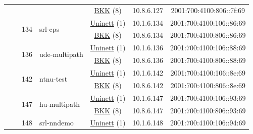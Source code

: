 \begin{small}
\begin{center}
\begin{longtable}{|c|c|c|c|c|c|c|c|}
  &  &  &  & \multicolumn{2}{|c|}{\tiny{\href{http://bkk.no}{BKK} (8)}} & \tiny{10.8.6.127} & \tiny{2001:700:4100:806::7f:69} \\* \cline{3-3}\cline{4-4}\cline{5-5}\cline{6-6}\cline{7-7}\cline{8-8}
  &  & \multirow{2}{*}{\tiny{134}} & \multicolumn{1}{|l|}{\multirow{2}{*}{\tiny{srl-cps}}} & \multicolumn{2}{|c|}{\tiny{\href{https://www.uninett.no}{Uninett} (1)}} & \tiny{10.1.6.134} & \tiny{2001:700:4100:106::86:69} \\* \cline{5-5}\cline{6-6}\cline{7-7}\cline{8-8}
  &  &  &  & \multicolumn{2}{|c|}{\tiny{\href{http://bkk.no}{BKK} (8)}} & \tiny{10.8.6.134} & \tiny{2001:700:4100:806::86:69} \\* \cline{3-3}\cline{4-4}\cline{5-5}\cline{6-6}\cline{7-7}\cline{8-8}
  &  & \multirow{2}{*}{\tiny{136}} & \multicolumn{1}{|l|}{\multirow{2}{*}{\tiny{ude-multipath}}} & \multicolumn{2}{|c|}{\tiny{\href{https://www.uninett.no}{Uninett} (1)}} & \tiny{10.1.6.136} & \tiny{2001:700:4100:106::88:69} \\* \cline{5-5}\cline{6-6}\cline{7-7}\cline{8-8}
  &  &  &  & \multicolumn{2}{|c|}{\tiny{\href{http://bkk.no}{BKK} (8)}} & \tiny{10.8.6.136} & \tiny{2001:700:4100:806::88:69} \\* \cline{3-3}\cline{4-4}\cline{5-5}\cline{6-6}\cline{7-7}\cline{8-8}
  &  & \multirow{2}{*}{\tiny{142}} & \multicolumn{1}{|l|}{\multirow{2}{*}{\tiny{ntnu-test}}} & \multicolumn{2}{|c|}{\tiny{\href{https://www.uninett.no}{Uninett} (1)}} & \tiny{10.1.6.142} & \tiny{2001:700:4100:106::8e:69} \\* \cline{5-5}\cline{6-6}\cline{7-7}\cline{8-8}
  &  &  &  & \multicolumn{2}{|c|}{\tiny{\href{http://bkk.no}{BKK} (8)}} & \tiny{10.8.6.142} & \tiny{2001:700:4100:806::8e:69} \\* \cline{3-3}\cline{4-4}\cline{5-5}\cline{6-6}\cline{7-7}\cline{8-8}
  &  & \multirow{2}{*}{\tiny{147}} & \multicolumn{1}{|l|}{\multirow{2}{*}{\tiny{hu-multipath}}} & \multicolumn{2}{|c|}{\tiny{\href{https://www.uninett.no}{Uninett} (1)}} & \tiny{10.1.6.147} & \tiny{2001:700:4100:106::93:69} \\* \cline{5-5}\cline{6-6}\cline{7-7}\cline{8-8}
  &  &  &  & \multicolumn{2}{|c|}{\tiny{\href{http://bkk.no}{BKK} (8)}} & \tiny{10.8.6.147} & \tiny{2001:700:4100:806::93:69} \\* \cline{3-3}\cline{4-4}\cline{5-5}\cline{6-6}\cline{7-7}\cline{8-8}
  &  & \multirow{2}{*}{\tiny{148}} & \multicolumn{1}{|l|}{\multirow{2}{*}{\tiny{srl-nndemo}}} & \multicolumn{2}{|c|}{\tiny{\href{https://www.uninett.no}{Uninett} (1)}} & \tiny{10.1.6.148} & \tiny{2001:700:4100:106::94:69} \\* \cline{5-5}\cline{6-6}\cline{7-7}\cline{8-8}

\end{longtable}
\end{center}
\end{small}
